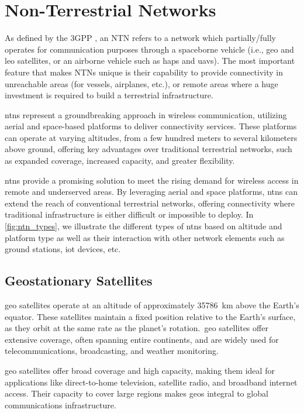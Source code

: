 \chapter{Non-Terrestrial Networks}\label{ch:non_terrestrial_networks}

As defined by the 3GPP \autocite{3gpp2018ntn}, an NTN refers to a network which partially/fully operates for communication purposes through a spaceborne vehicle (i.e., \gls{geo} and \gls{leo} satellites, or an airborne vehicle such as \glspl{hap} and \glspl{uav}). The most important feature that makes NTNs unique is their capability to provide connectivity in unreachable areas (for vessels, airplanes, etc.), or remote areas where a huge investment is required to build a terrestrial infrastructure.

\glspl{ntn} represent a groundbreaking approach in wireless communication, utilizing aerial and space-based platforms to deliver connectivity services. These platforms can operate at varying altitudes, from a few hundred meters to several kilometers above ground, offering key advantages over traditional terrestrial networks, such as expanded coverage, increased capacity, and greater flexibility.

\glspl{ntn} provide a promising solution to meet the rising demand for wireless access in remote and underserved areas. By leveraging aerial and space platforms, \glspl{ntn} can extend the reach of conventional terrestrial networks, offering connectivity where traditional infrastructure is either difficult or impossible to deploy. In \cref{fig:ntn_types}, we illustrate the different types of \glspl{ntn} based on altitude and platform type as well as their interaction with other network elements such as ground stations, \gls{iot} devices, etc.

\section{Geostationary Satellites}

\gls{geo} satellites operate at an altitude of approximately \SI{35786}{\kilo\meter} above the Earth's equator. These satellites maintain a fixed position relative to the Earth’s surface, as they orbit at the same rate as the planet's rotation.\ \gls{geo} satellites offer extensive coverage, often spanning entire continents, and are widely used for telecommunications, broadcasting, and weather monitoring.

\gls{geo} satellites offer broad coverage and high capacity, making them ideal for applications like direct-to-home television, satellite radio, and broadband internet access. Their capacity to cover large regions makes \glspl{geo} integral to global communications infrastructure.

